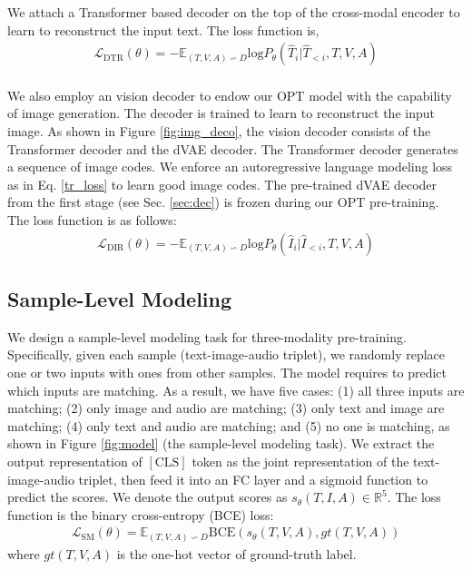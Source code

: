 \documentclass[10pt,twocolumn,letterpaper]{article}
\begin{document}
 We attach a Transformer based decoder \cite{vaswani2017attention} on the top of the cross-modal encoder to learn to reconstruct the input text. The loss function is,
\begin{align}
\mathcal{L}_{\mathrm{DTR}}(\theta) = - \mathbb{E}_{(T,V,A) \backsim D} \mathrm{log} P_\theta (\hat{T}_i | \hat{T}_{<i}, T, V, A)    \label{tr_loss}
\end{align} 
\\
 We also employ an vision decoder to endow our OPT model with the capability of image generation. The decoder is trained to learn to reconstruct the input image. As shown in Figure \ref{fig:img_deco}, the vision decoder consists of the Transformer decoder and the dVAE decoder. The Transformer decoder generates a sequence of image codes. We enforce an autoregressive language modeling loss as in Eq. \ref{tr_loss} to learn good image codes. The pre-trained dVAE decoder from the first stage (see Sec. \ref{sec:dec}) is frozen during our OPT pre-training. The loss function is as follows: 
\begin{align}
\mathcal{L}_{\mathrm{DIR}}(\theta) = - \mathbb{E}_{(T,V,A) \backsim D} \mathrm{log} P_\theta (\hat{I}_i | \hat{I}_{<i}, T, V, A) 
\end{align}
 
\subsection{Sample-Level Modeling}
We design a sample-level modeling task for three-modality pre-training. Specifically, given each sample (\ie text-image-audio triplet), we randomly replace one or two inputs with ones from other samples. The model requires to predict which inputs are matching. As a result, we have five cases: (1) all three inputs are matching; (2) only image and audio are matching; (3) only text and image are matching; (4) only text and audio are matching; and (5) no one is matching, as shown in Figure \ref{fig:model} (the sample-level modeling task). We extract the output representation of $[\mathrm{CLS}]$ token as the joint representation of the text-image-audio triplet, then feed it into an FC layer and a sigmoid function to predict the scores. We denote the output scores as $s_\theta(T,I,A) \in \mathbb{R}^5$. The loss function is the binary cross-entropy (BCE) loss:
\begin{align}
\mathcal{L}_{\mathrm{SM}}(\theta) = \mathbb{E}_{(T,V,A)\backsim D}\mathrm{BCE}(s_\theta(T,V,A), gt(T,V,A)) 
\end{align}  
where $gt(T,V,A)$ is the one-hot vector of ground-truth label.
\end{document}
